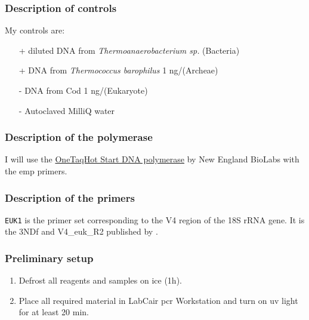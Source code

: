 \subsubsection{Description of controls}
My controls are:
\begin{itemize}
\item[+] diluted DNA from \textit{Thermoanaerobacterium sp.} (Bacteria)
\item[+] DNA from \textit{Thermococcus barophilus} 1 ng/\uL (Archeae)
\item[-] DNA from Cod 1 ng/\uL (Eukaryote)
\item[-] Autoclaved MilliQ water
\end{itemize}



\subsubsection{Description of the polymerase}

I will use the \href{https://www.neb.com/products/m0481-onetaq-hot-start-dna-polymerase#Product%20Information}{OneTaq\cR Hot Start DNA polymerase} by New England BioLabs with the \gls{emp} primers.

\subsubsection{Description of the primers}

\texttt{EUK1} is the primer set corresponding to the V4 region of the 18S rRNA gene. It is the 3NDf and V4\_euk\_R2 published by \citet{braate2010freshwater}.


\subsubsection{Preliminary setup}

\begin{enumerate}
\item Defrost all reagents and samples on ice (1h). 
\item Place all required material in LabCair \gls{pcr} Workstation and turn on \gls{uv} light for at least 20 min.
\end{enumerate}

